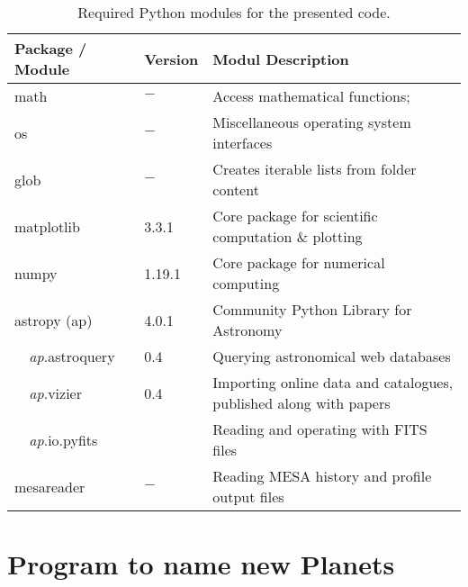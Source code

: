 \begin{table}[h!]
  \vspace{3mm}
  \tabcolsep=8pt
  \caption{Required Python modules for the presented code.}
    \begin{tabular}{p{}
                    p{}
                    p{}}
    \hline\hline
    Package / Module & Version & Modul Description\\
    \hline
    math  & $-$ & Access mathematical functions; \\
    os    & $-$    & Miscellaneous 
    operating system interfaces  \\
    glob & $-$ & Creates iterable lists from folder content \\

    matplotlib &  3.3.1 & Core package for scientific computation \& plotting \\
    numpy & 1.19.1 & Core package for numerical computing \\

    \hline
    astropy (ap) & 4.0.1 & Community Python Library for Astronomy  \\
    \textit{~~ap}.astroquery & 0.4   & Querying astronomical web databases \\
    \textit{~~ap}.vizier & 0.4   & Importing online data and catalogues, published along with papers \\
    \textit{~~ap}.io.pyfits & & Reading and operating with FITS files \\
    mesareader & $-$ & Reading MESA history and profile output files\\
    \hline
    \end{tabular}
  \label{tab:PyModules}
  
\end{table}

\section{Program to name new Planets \label{cod:HellowWorld}}

